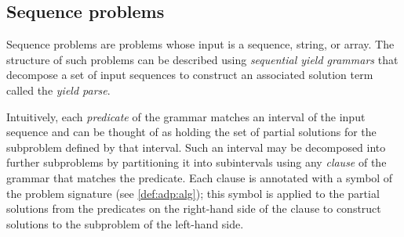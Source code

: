 

\subsection{Sequence problems}

Sequence problems are problems whose input is 
a sequence, string, or array.
The structure of such problems can be described using \emph{sequential yield grammars} that decompose a set of input sequences to construct an associated solution term called the \emph{yield parse}.

Intuitively, each \emph{predicate} of the grammar matches an interval of the input sequence and can be thought of as holding the set of partial solutions for the subproblem defined by that interval.
Such an interval may be decomposed into further subproblems by partitioning it into subintervals using any \emph{clause} of the grammar that matches the predicate.
Each clause is annotated with a symbol of the problem signature (see \cref{def:adp:alg}); this symbol is applied to the partial solutions from the predicates on the right-hand side of the clause to construct solutions to the subproblem of the left-hand side.

